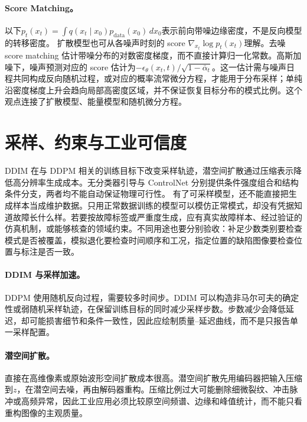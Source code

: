 \paragraph{Score Matching。}
以下$p_t(x_t)=\int q(x_t\mid x_0)p_{\mathrm{data}}(x_0)\,dx_0$表示前向带噪边缘密度，不是反向模型的转移密度。
扩散模型也可从各噪声时刻的 score $\nabla_{x_t}\log p_t(x_t)$理解。去噪 score matching 估计带噪分布的对数密度梯度，而不直接计算归一化常数。高斯加噪下，噪声预测对应的 score 估计为$-\epsilon_\theta(x_t,t)/\sqrt{1-\bar\alpha_t}$。这一估计需与噪声日程共同构成反向随机过程，或对应的概率流常微分方程，才能用于分布采样；单纯沿密度梯度上升会趋向局部高密度区域，并不保证恢复目标分布的模式比例。这个观点连接了扩散模型、能量模型和随机微分方程。

\section{采样、约束与工业可信度}
DDIM 在与 DDPM 相关的训练目标下改变采样轨迹，潜空间扩散通过压缩表示降低高分辨率生成成本\cite{song2021ddim,rombach2022latent}。无分类器引导与 ControlNet 分别提供条件强度组合和结构条件分支\cite{ho2022cfg,zhang2023controlnet}，两者均不能自动保证物理可行性。
有了可采样模型，还不能直接把生成样本当成维护数据。只用正常数据训练的模型可以模仿正常模式，却没有凭据知道故障长什么样。若要按故障标签或严重度生成，应有真实故障样本、经过验证的仿真机制，或能够核查的领域约束。不同用途也要分别验收：补足少数类别要检查模式是否被覆盖，模拟退化要检查时间顺序和工况，指定位置的缺陷图像要检查位置与标注是否一致。

\paragraph{DDIM 与采样加速。}
DDPM 使用随机反向过程，需要较多时间步。DDIM 可以构造非马尔可夫的确定性或弱随机采样轨迹，在保留训练目标的同时减少采样步数。步数减少会降低延迟，却可能损害细节和条件一致性，因此应绘制质量--延迟曲线，而不是只报告单一采样配置。

\paragraph{潜空间扩散。}
直接在高维像素或原始波形空间扩散成本很高。潜空间扩散先用编码器把输入压缩到$z$，在潜空间去噪，再由解码器重构。压缩比例过大可能删除细微裂纹、冲击脉冲或高频异常，因此工业应用必须比较原空间频谱、边缘和峰值统计，而不能只看重构图像的主观质量。

